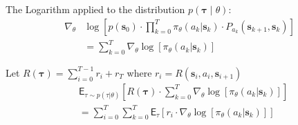 \documentclass[a4paper,12pt, oneside, twocolumn]{scrartcl}
\begin{document}
The Logarithm applied to the distribution $p(\bm{\tau} \mid \theta)$:
%
\begin{align*}
    \nabla_{\theta}
    &
    \log
    \left[
        p(\bm{s}_0) \cdot \prod_{k=0}^{T} \pi_{\theta}(a_k|\bm{s}_k) \cdot P_{a_k}(\bm{s}_{k+1}, \bm{s}_k)
    \right]
    \\
    &=
    \sum_{k=0}^{T} \nabla_{\theta} 
    \log\left[
        \pi_{\theta}(a_k|\bm{s}_k)
    \right]
\end{align*}

Let $R(\bm{\tau}) = \sum_{i=0}^{T-1} r_i + r_T$ where $r_i = R(\bm{s}_i, a_i, \bm{s}_{i+1})$
%
\begin{align*}
    &\mathsf{E}_{\tau \sim p(\tau|\theta)}
    \left[
        R(\bm{\tau}) \cdot \sum_{k=0}^{T} \nabla_{\theta} 
        \log\left[
            \pi_{\theta}(a_k|\bm{s}_k)
        \right]
    \right]
    \\
    &=
    \sum_{i=0}^{T}
    \sum_{k=0}^{T}
    \mathsf{E}_{\tau}
    \left[
        r_i 
        \cdot 
        \nabla_{\theta} \log
        \left[
            \pi_{\theta}(a_k|\bm{s}_k)
        \right]
    \right]
\end{align*}
\end{document}
